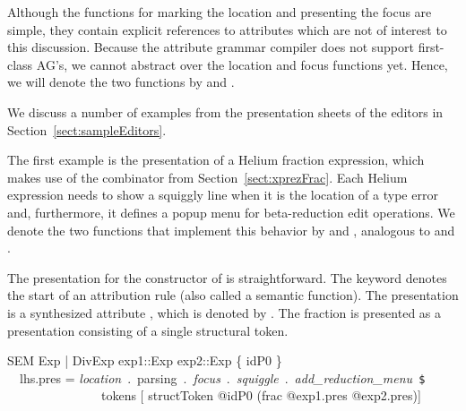 Although the functions for marking the location and presenting the focus are simple, they contain explicit references to attributes which are not of interest to this discussion. Because the attribute grammar compiler does not support first-class AG's, we cannot abstract over the  location and focus functions yet. Hence, we will denote the two functions by  and . 



We discuss a number of examples from the presentation sheets of the editors in Section~\ref{sect:sampleEditors}.


The first example is the presentation of a Helium fraction expression, which makes use of the  combinator from Section~\ref{sect:xprezFrac}. Each Helium expression needs to show a squiggly line when it is the location of a type error and, furthermore, it defines a popup menu for beta-reduction edit operations. We denote the two functions that implement this behavior by  and , analogous to  and . 

The presentation for the  constructor of  is straightforward. 
The  keyword denotes the start of an attribution rule (also called a semantic function). The presentation is a synthesized attribute , which is denoted by .  The fraction is presented as a  presentation consisting of a single structural token.


\ttfamily\begin{small}\begin{tabbing}
SEM Exp | DivExp exp1::Exp exp2::Exp \{ idP0 \}\\
~~lhs.pres = {\em location}~.~parsing~.~{\em focus}~.~{\em squiggle}~.~{\em add\_reduction\_menu}~\verb|$|\\
~~~~~~~~~~~~~~~tokens [ structToken @idP0 (frac @exp1.pres @exp2.pres)]
\end{tabbing}\end{small}\rmfamily

